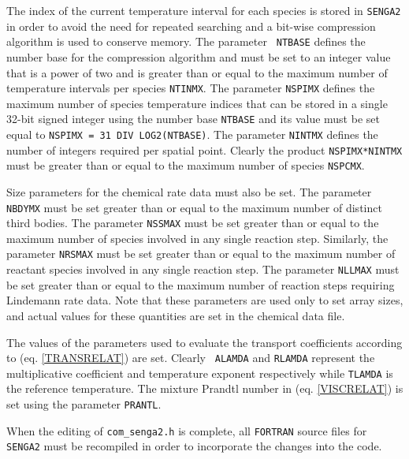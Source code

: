 \documentclass[dvips]{article}
\begin{document}
The index of the current temperature interval for each species is stored
in {\tt SENGA2} in order to avoid the need for repeated searching and a
bit-wise compression algorithm is used to conserve memory.  The parameter {\tt
NTBASE} defines the number base for the compression algorithm and 
must be set to an integer value that is a power of two and is
greater than or equal to the maximum number of temperature intervals per
species {\tt NTINMX}.  The parameter {\tt NSPIMX} defines the maximum
number of species temperature indices that can be stored in a single
32-bit signed integer using the number base {\tt NTBASE} and its value
must be set equal to
{\tt NSPIMX = 31 DIV LOG2(NTBASE)}.  The parameter {\tt NINTMX} defines
the number of integers required per spatial point.  Clearly the product
{\tt NSPIMX*NINTMX} must be greater than or equal to the maximum number of
species {\tt NSPCMX}.

Size parameters for the chemical rate data must also be set.  The parameter
{\tt NBDYMX} must be set greater than or equal to the maximum number of
distinct third bodies.  The parameter {\tt NSSMAX} must be set
greater than or equal to the maximum number of species involved in any
single reaction step.  Similarly, the parameter {\tt NRSMAX} must be set
greater than or equal to the maximum number of reactant species involved in
any single reaction step.  The parameter {\tt NLLMAX} must be set
greater than or equal to the maximum number of reaction steps requiring
Lindemann rate data. Note that these parameters
are used only to set array sizes, and actual values
for these quantities are set in the chemical data file. 

The values of the parameters used to evaluate the transport
coefficients according to (eq. \ref{TRANSRELAT}) are set.  Clearly {\tt
ALAMDA} and {\tt RLAMDA} represent the multiplicative coefficient and
temperature exponent respectively while {\tt TLAMDA} is the reference
temperature.  The mixture Prandtl number in (eq. \ref{VISCRELAT}) is set
using the parameter {\tt PRANTL}.

When the editing of {\tt com\_senga2.h} is complete, all {\tt FORTRAN} source
files for {\tt SENGA2} must be recompiled in order to incorporate the
changes into the code.
\end{document}
